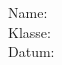 \documentclass[10pt,ngerman]{examdesign}
\begin{document}
\begin{examtop}
    \hfill
    \parbox{10cm}{
    Name: \hrulefill\\[5pt]
    Klasse: \hrulefill\\[5pt]
    Datum: \hrulefill}
    \bigskip


\end{examtop}
\pagebreak
\end{document}
